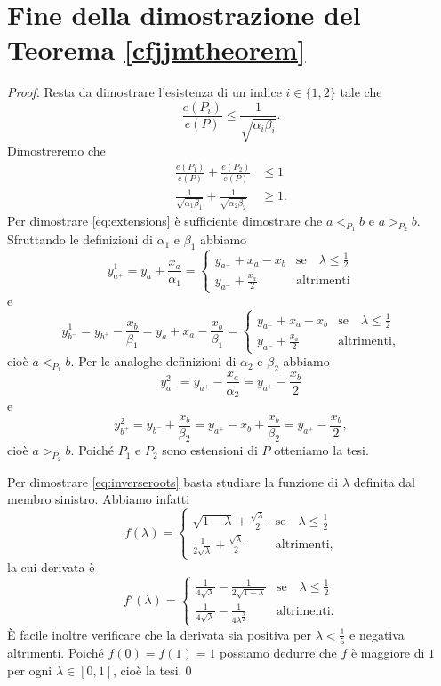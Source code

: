 \appendix
\chapter{Fine della dimostrazione del Teorema \ref{cfjjmtheorem}}
\begin{proof}
    Resta da dimostrare l'esistenza di un indice \(i\in\{1,2\}\) tale che \[\frac{e(P_i)}{e(P)}\le\frac{1}{\sqrt{\alpha_i\beta_i}}.\]
    Dimostreremo che
    \begin{align}
        \frac{e(P_1)}{e(P)}+\frac{e(P_2)}{e(P)}&\le 1 \label{eq:extensions} \\
        \frac{1}{\sqrt{\alpha_1\beta_1}}+\frac{1}{\sqrt{\alpha_2\beta_2}}&\ge 1. \label{eq:inverseroots}
    \end{align}
    Per dimostrare \eqref{eq:extensions} \`e sufficiente dimostrare che \(a<_{P_1} b\) e \(a>_{P_2} b\). Sfruttando le definizioni di \(\alpha_1\) e \(\beta_1\) abbiamo
    \[
        y_{a^+}^1 = y_a+\frac{x_a}{\alpha_1} = 
        \begin{cases}
            y_{a^-}+x_a-x_b &\text{se}\quad\lambda\le\frac{1}{2}\\
            y_{a^-}+\frac{x_a}{2} &\text{altrimenti}
        \end{cases}
    \]
    e
    \[
        y_{b^-}^1 = y_{b^+}-\frac{x_b}{\beta_1} = y_a+x_a-\frac{x_b}{\beta_1} =
        \begin{cases}
            y_{a^-}+x_a-x_b &\text{se}\quad\lambda\le\frac{1}{2} \\
            y_{a^-}+\frac{x_a}{2} &\text{altrimenti,}
        \end{cases}
    \]
    cio\`e \(a<_{P_1} b\). Per le analoghe definizioni di \(\alpha_2\) e \(\beta_2\) abbiamo
    \[
        y_{a^-}^2 = y_{a^+}-\frac{x_a}{\alpha_2} = y_{a^+} - \frac{x_b}{2}
    \]
    e
    \[
        y_{b^+}^2 = y_{b^-}+\frac{x_b}{\beta_2} = y_{a^+}-x_b+\frac{x_b}{\beta_2} = y_{a^+}-\frac{x_b}{2},
    \]
    cio\`e \(a>_{P_2} b\). Poich\'e \(P_1\) e \(P_2\) sono estensioni di \(P\) otteniamo la tesi.

    Per dimostrare \eqref{eq:inverseroots} basta studiare la funzione di \(\lambda\) definita dal membro sinistro. Abbiamo infatti
    \[
        f(\lambda) = 
        \begin{cases}
            \sqrt{1-\lambda}+\frac{\sqrt{\lambda}}{2} &\text{se}\quad\lambda\le\frac{1}{2} \\
            \frac{1}{2\sqrt{\lambda}}+\frac{\sqrt{\lambda}}{2} &\text{altrimenti,}
        \end{cases}
    \]
    la cui derivata \`e
    \[
        f'(\lambda) = 
        \begin{cases}
            \frac{1}{4\sqrt{\lambda}}-\frac{1}{2\sqrt{1-\lambda}} &\text{se}\quad\lambda\le\frac{1}{2} \\
            \frac{1}{4\sqrt{\lambda}}-\frac{1}{4\lambda^{\frac{3}{2}}} &\text{altrimenti.}
        \end{cases}
    \]
    \`E facile inoltre verificare che la derivata sia positiva per \(\lambda < \frac{1}{5}\) e negativa altrimenti. Poich\'e \(f(0)=f(1)=1\) possiamo dedurre che \(f\) \`e maggiore di \(1\) per ogni \(\lambda\in [0,1]\), cio\`e la tesi.\qed
\end{proof}
